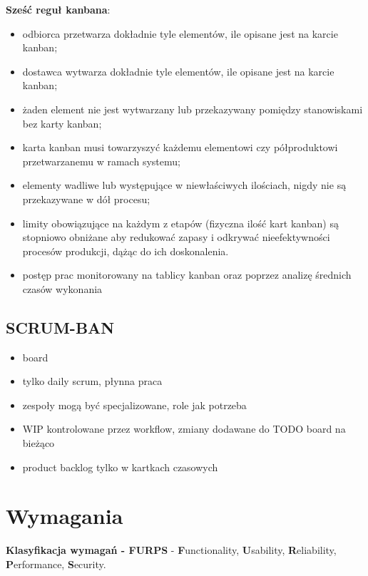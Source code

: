 \documentclass[a4paper]{article}
\begin{document}
    \textbf{Sześć reguł kanbana}:
    \begin{itemize}
        \item odbiorca przetwarza dokładnie tyle elementów, ile opisane jest na karcie kanban;
        \item dostawca wytwarza dokładnie tyle elementów, ile opisane jest na karcie kanban;
        \item żaden element nie jest wytwarzany lub przekazywany pomiędzy stanowiskami bez karty kanban;
        \item karta kanban musi towarzyszyć każdemu elementowi czy półproduktowi przetwarzanemu w ramach systemu;
        \item elementy wadliwe lub występujące w niewłaściwych ilościach, nigdy nie są przekazywane w dół procesu;
        \item limity obowiązujące na każdym z etapów (fizyczna ilość kart kanban) są stopniowo obniżane aby redukować zapasy i
        odkrywać nieefektywności procesów produkcji, dążąc do ich doskonalenia.
        \item postęp prac monitorowany na tablicy kanban oraz poprzez analizę średnich czasów wykonania\\
    \end{itemize}


    \subsection{SCRUM-BAN}
    \begin{itemize}
        \item board
        \item tylko daily scrum, płynna praca
        \item zespoły mogą być specjalizowane, role jak potrzeba
        \item WIP kontrolowane przez workflow, zmiany dodawane do TODO board na bieżąco
        \item product backlog tylko w kartkach czasowych
    \end{itemize}


    \section{Wymagania}
    \textbf{Klasyfikacja wymagań - FURPS} - \textbf{F}unctionality, \textbf{U}sability, \textbf{R}eliability,
    \textbf{P}erformance, \textbf{S}ecurity.
\end{document}
